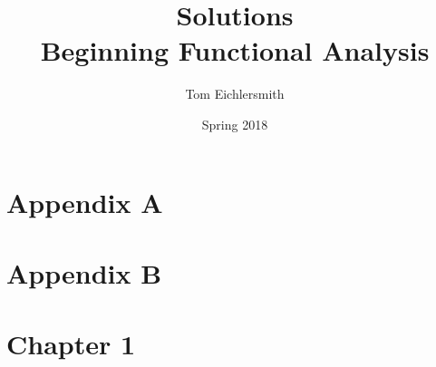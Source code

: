 \documentclass{article}
\title{Solutions \\ Beginning Functional Analysis}
\author{Tom Eichlersmith}
\date{Spring 2018}
\begin{document}
 
\maketitle
 
\section*{Appendix A}
 


\section*{Appendix B}



\section*{Chapter 1}


 
\end{document}
